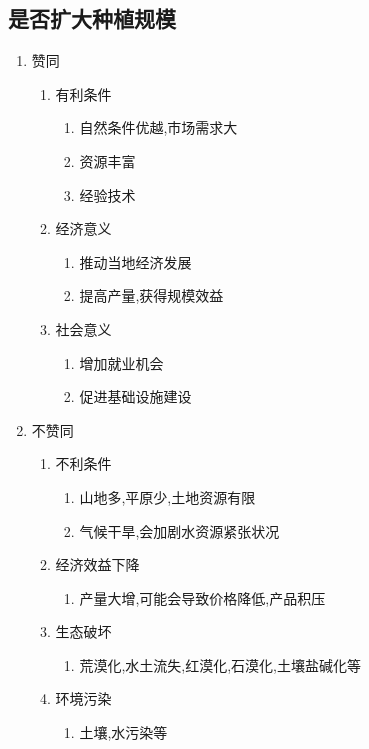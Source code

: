 \documentclass[a4paper]{article}
\begin{document}
    \subsection{是否扩大种植规模}
    \begin{enumerate}
        \item 赞同
        \begin{enumerate}
            \item 有利条件
            \begin{enumerate}
                \item 自然条件优越,市场需求大
                \item 资源丰富
                \item 经验技术
            \end{enumerate}
            \item 经济意义
            \begin{enumerate}
                \item 推动当地经济发展
                \item 提高产量,获得规模效益
            \end{enumerate}
            \item 社会意义
            \begin{enumerate}
                \item 增加就业机会
                \item 促进基础设施建设
            \end{enumerate}
        \end{enumerate}
        \item 不赞同
        \begin{enumerate}
            \item 不利条件
            \begin{enumerate}
                \item 山地多,平原少,土地资源有限
                \item 气候干旱,会加剧水资源紧张状况
            \end{enumerate}
            \item 经济效益下降
            \begin{enumerate}
                \item 产量大增,可能会导致价格降低,产品积压
            \end{enumerate}
            \item 生态破坏
            \begin{enumerate}
                \item 荒漠化,水土流失,红漠化,石漠化,土壤盐碱化等
            \end{enumerate}
            \item 环境污染
            \begin{enumerate}
                \item 土壤,水污染等
            \end{enumerate}
        \end{enumerate}
    \end{enumerate}
\end{document}
